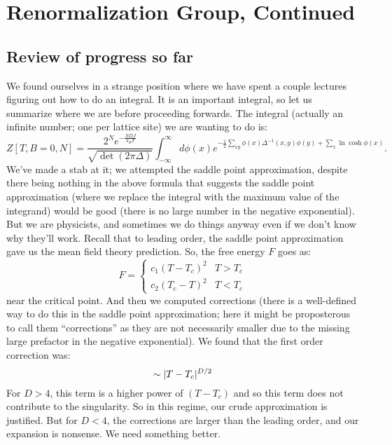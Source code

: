 \section{Renormalization Group, Continued}
\subsection{Review of progress so far}
We found ourselves in a strange position where we have spent a couple lectures figuring out how to do an integral. It is an important integral, so let us summarize where we are before proceeding forwards. The integral (actually an infinite number; one per lattice site) we are wanting to do is:
\begin{equation}
    Z[T, B = 0, N] = \frac{2^N e^{-\frac{NDJ}{k_B T}}}{\sqrt{\det(2\pi\Delta)}}\int_{-\infty}^\infty d\phi(x) e^{-\frac{1}{2}\sum_{xy}\phi(x)\Delta^{-1}(x,y)\phi(y) + \sum_x \ln\cosh\phi(x)}.
\end{equation}
We've made a stab at it; we attempted the saddle point approximation, despite there being nothing in the above formula that suggests the saddle point approximation (where we replace the integral with the maximum value of the integrand) would be good (there is no large number in the negative exponential). But we are physicists, and sometimes we do things anyway even if we don't know why they'll work. Recall that to leading order, the saddle point approximation gave us the mean field theory prediction. So, the free energy $F$ goes as:
\begin{equation}
    F = \begin{cases}
        c_1(T - T_c)^2 & T > T_c
        \\ c_2(T_c - T)^2 & T < T_c
    \end{cases}
\end{equation}
near the critical point. And then we computed corrections (there is a well-defined way to do this in the saddle point approximation; here it might be proposterous to call them ``corrections'' as they are not necessarily smaller due to the missing large prefactor in the negative exponential). We found that the first order correction was:
\begin{equation}
    \sim \lvert T - T_c \rvert^{D/2}
\end{equation}
For $D > 4$, this term is a higher power of $(T - T_c)$ and so this term does not contribute to the singularity. So in this regime, our crude approximation is justified. But for $D < 4$, the corrections are larger than the leading order, and our expansion is nonsense. We need something better. 

